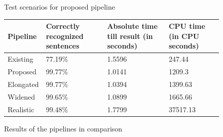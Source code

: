 \begin{figure}[ht]	
	\centering
	
	\caption{Test scenarios for proposed pipeline}
	\label{pic:eval_p3_5_diag}
\end{figure}

\begin{figure}[ht]
	\begin{tabular}{ | l | p{} | p{} | p{} |}
		\hline
		Pipeline & Correctly recognized sentences & Absolute time till result (in seconds) & CPU time (in CPU seconds) \\ \hline
		Existing & 77.19\% & 1.5596 &  247.44 \\ \hline
		Proposed & 99.77\% & 1.0141 & 1209.3 \\ \hline
		Elongated & 99.77\% & 1.0394 & 1399.63 \\ \hline
		Widened & 99.65\% & 1.0899 & 1665.66 \\ \hline
		Realistic & 99.48\% & 1.7799 & 37517.13 \\ \hline
	\end{tabular}
	\caption{Results of the pipelines in comparison}
	\label{table:eval_dataset_results}
\end{figure}


